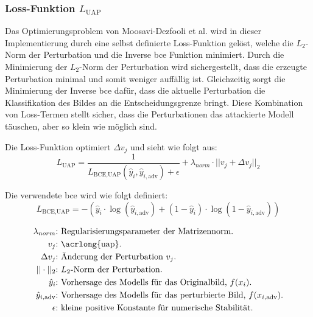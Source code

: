 \newpage
\subsubsection{Loss-Funktion \texorpdfstring{$L_{\text{UAP}}$}{Loss-Funktion L UAP}}
Das Optimierungsproblem von Moosavi-Dezfooli et al. \cite{moosavi-dezfooli_universal_2017} wird in dieser Implementierung durch eine selbst definierte Loss-Funktion gelöst, welche die $L_2$-Norm der Perturbation und die Inverse \acrlong{bce} Funktion minimiert. Durch die Minimierung der $L_2$-Norm der Perturbation wird sichergestellt, dass die erzeugte Perturbation minimal und somit weniger auffällig ist. Gleichzeitig sorgt die Minimierung der Inverse \acrlong{bce} dafür, dass die aktuelle Perturbation die Klassifikation des Bildes an die Entscheidungsgrenze bringt. Diese Kombination von Loss-Termen stellt sicher, dass die Perturbationen das attackierte Modell täuschen, aber so klein wie möglich sind.

Die Loss-Funktion optimiert $\Delta v_j$ und sieht wie folgt aus:
\begin{equation}
    L_{\text{UAP}} = \frac{1}{L_{\text{BCE,UAP}}(\hat{y}_i, \hat{y}_{i,\text{adv}}) + \epsilon} + \lambda_{norm} \cdot ||v_j + \Delta v_j||_2 
\label{eq:Loss L_UAP}
\end{equation}

Die verwendete \acrlong{bce} wird wie folgt definiert:
\begin{equation}
L_{\text{BCE,UAP}} = - (\hat{y}_i \cdot \log(\hat{y}_{i,\text{adv}}) + (1-\hat{y}_i) \cdot \log(1-\hat{y}_{i,\text{adv}}))
\label{eq:BCE_UAP}
\end{equation}

\begin{align*}
    \lambda_{norm}\text{:} &\text{ Regularisierungsparameter der Matrizennorm.} \\
    v_j\text{:} &\text{ \acrlong{uap}.} \\
    \Delta v_j\text{:} &\text{ Änderung der Perturbation } v_j \text{.} \\
    ||\cdot||_2\text{:} & \text{ $L_2$-Norm der Perturbation.} \\
    \hat{y}_i\text{:} &\text{ Vorhersage des Modells für das Originalbild, $f(x_{i})$.} \\
    \hat{y}_{i,\text{adv}}\text{:} &\text{ Vorhersage des Modells für das perturbierte Bild, $f(x_{i,\text{adv}})$.} \\
    \epsilon\text{:} &\text{ kleine positive Konstante für numerische Stabilität.}
\end{align*}

